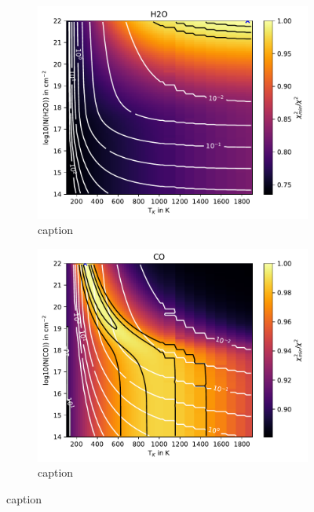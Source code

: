 \documentclass[twoside, single, authoryear, semicolon, 12pt]{lion-msc}
\newcommand{\4}{$_4$}
\newcommand{\3}{$_3$}
\newcommand{\2}{$_2$}
\begin{document}
\begin{figure}[!ht]
    \centering
    \begin{subfigure}[b]{0.49\textwidth}
        \centering
        \includegraphics[width=\textwidth]{radexpy_niels/Radexpy_for_Niels/chi2_map_H2O_V1094Sco.pdf}
        \caption{caption}
    \end{subfigure}
    \hfill
    \begin{subfigure}[b]{0.49\textwidth}
        \centering
        \includegraphics[width=\textwidth]{radexpy_niels/Radexpy_for_Niels/chi2_map_CO_V1094Sco.pdf}
        \caption{caption}
    \end{subfigure}
    \caption{caption}
\end{figure}
\end{document}
